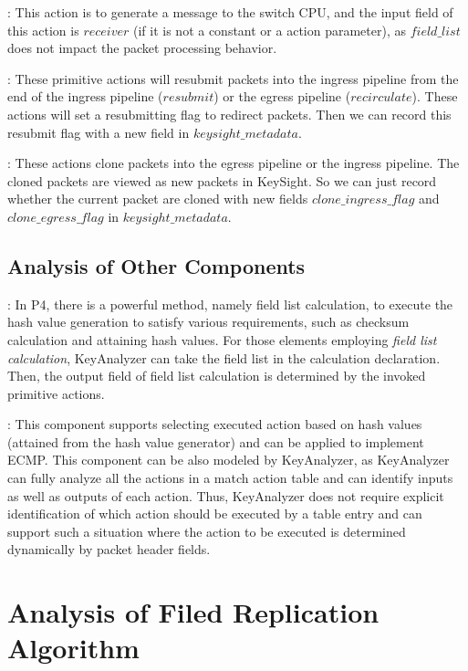 \documentclass[sigconf]{acmart}
\begin{document}
: This action is to generate a message to the switch CPU, and the input field of this action is $receiver$ (if it is not a constant or a action parameter), as $field\_list$ does not impact the packet processing behavior.

 : These primitive actions will resubmit packets into the ingress pipeline from the end of the ingress pipeline ($resubmit$) or the egress pipeline ($recirculate$). These actions will set a resubmitting flag to redirect packets. Then we can record this resubmit flag with a new field in $keysight\_metadata$.

 : These actions clone packets into the egress pipeline or the ingress pipeline. The cloned packets are viewed as new packets in KeySight. So we can just record whether the current packet are cloned with new fields $clone\_ingress\_flag$ and $clone\_egress\_flag$ in $keysight\_metadata$.

\subsection{Analysis of Other Components}


: In P4, there is a powerful method, namely field list calculation, to execute the hash value generation to satisfy various requirements, such as checksum calculation and attaining hash values. For those elements employing \textit{field list calculation}, KeyAnalyzer can take the field list in the calculation declaration. Then, the output field of field list calculation is determined by the invoked primitive actions. 

: This component supports selecting executed action based on hash values (attained from the hash value generator) and can be applied to implement ECMP. This component can be also modeled by KeyAnalyzer, as KeyAnalyzer can fully analyze all the actions in a match action table and can identify inputs as well as outputs of each action. Thus, KeyAnalyzer does not require explicit identification of which action should be executed by a table entry and can support such a situation where the action to be executed is determined dynamically by packet header fields. 

\section{Analysis of Filed Replication Algorithm}
\end{document}
